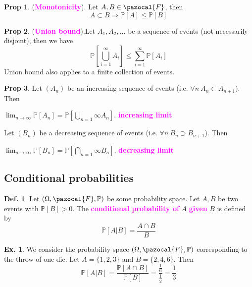 \documentclass[8pt,a4paper,landscape]{article}
\theoremstyle{definition}
\newtheorem{definition}{Def.}[section]
\theoremstyle{example}
\newtheorem{example}{Ex.}[section]
\theoremstyle{intuition}
\theoremstyle{definition}
\newtheorem{proposition}{Prop}[section]
\newcommand{\Fb}{\pazocal{F}}
\newcommand{\mydef}[1]{\textcolor{magenta}{\textbf{#1}}}
\newcommand{\prob}[1]{\mathbb{P}\left[ #1 \right]}
\begin{document}
\begin{multicols}{3}
				\begin{proposition}
					(\mydef{Monotonicity}). Let $A, B \in \Fb$, then
					$$
						A \subset B \Rightarrow \prob{A} \leq \prob{B}
					$$
				\end{proposition}
				
				\begin{proposition}
					(\mydef{Union bound}).Let $A_1, A_2, \ldots$ be a sequence of events (not necessarily disjoint), then we have
					$$
						\prob{\bigcup\limits_{i=1}^{\infty} A_i} \leq \sum_{i=1}^{\infty}\prob{A_i}
					$$
					Union bound also applies to a finite collection of events.
				\end{proposition}
				
				\begin{proposition}
					Let $(A_n)$ be an increasing sequence of events (i.e. $\forall n \ A_n \subset A_{n+1}$). Then
					\begin{center}
						$\lim_{n \rightarrow \infty} \prob{A_n} = \prob{\bigcup\limits_{n=1}{\infty} A_n}$. \mydef{increasing limit}
					\end{center}
					Let $(B_n)$ be a decreasing sequence of events (i.e. $\forall n \ B_n \supset B_{n+1}$). Then
					\begin{center}
						$\lim_{n \rightarrow \infty} \prob{B_n} = \prob{\bigcap\limits_{n=1}{\infty} B_n}$. \mydef{decreasing limit}
					\end{center}
				\end{proposition}
				
				
			\subsection{Conditional probabilities}
			
				\begin{definition}
					Let $(\Omega, \Fb, \mathbb{P})$ be some probability space. Let $A, B$ be two events with $\prob{B} > 0$. The \mydef{conditional probability of} $A$ \mydef{given} $B$ is defined by
					$$
						\prob{A \lvert B} = \frac{A \cap B}{B}
					$$
				\end{definition}
				
				\begin{example}
					We consider the probability space $(\Omega, \Fb, \mathbb{P})$ corresponding to the throw of one die. Let $A = \{1,2,3\}$ and $B = \{2,4,6\}$. Then
					$$
						\prob{A \lvert B} = \frac{\prob{A \cap B}}{\prob{B}} = \frac{\frac{1}{6}}{\frac{1}{2}} = \frac{1}{3}
					$$
				\end{example}
				

\end{multicols}
\end{document}
